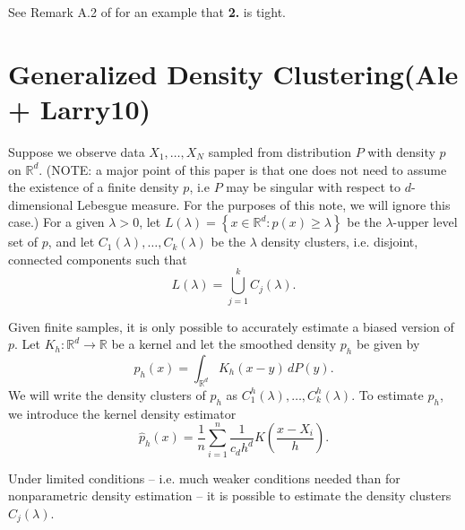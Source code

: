 \documentclass{article}
\newcommand{\Reals}{\mathbb{R}}
\newcommand{\set}[1]{\left\{#1\right\}}
\newcommand{\1}{\mathbb{I}}
\newcommand{\Rd}{\Reals^d}
\theoremstyle{alden}
\theoremstyle{aldenthm}
\theoremstyle{definition}
\theoremstyle{remark}
\begin{document}
See Remark A.2 of \cite{diaconis08} for an example that \textbf{2.} is tight.

\section{Generalized Density Clustering(Ale + Larry10)}

Suppose we observe data $X_1,\ldots,X_N$ sampled from distribution $P$ with density $p$ on $\Reals^d$. (NOTE: a major point of this paper is that one does not need to assume the existence of a finite density $p$, i.e $P$ may be singular with respect to $d$-dimensional Lebesgue measure. For the purposes of this note, we will ignore this case.) For a given $\lambda > 0$, let $L(\lambda) = \set{x \in \Rd: p(x) \geq \lambda}$ be the $\lambda$-upper level set of $p$, and let $C_1(\lambda),\ldots,C_{k}(\lambda)$ be the $\lambda$ density clusters, i.e. disjoint, connected components such that 
\begin{equation*}
L(\lambda) = \bigcup_{j = 1}^{k} C_j(\lambda).
\end{equation*}

Given finite samples, it is only possible to accurately estimate a biased version of $p$. Let $K_h: \Rd \to \Reals$ be a kernel and let the smoothed density $p_h$ be given by
\begin{equation*}
p_h(x) = \int_{\Rd} K_h(x - y) \,dP(y).
\end{equation*}
We will write the density clusters of $p_h$ as $C_1^{h}(\lambda), \ldots, C_k^{h}(\lambda)$. To estimate $p_h$, we introduce the kernel density estimator
\begin{equation*}
\widehat{p}_h(x) = \frac{1}{n} \sum_{i = 1}^{n} \frac{1}{c_d h^d} K\left(\frac{x - X_i}{h}\right).
\end{equation*}

Under limited conditions -- i.e. much weaker conditions needed than for nonparametric density estimation -- it is possible to estimate the density clusters $C_j(\lambda)$. 
\end{document}
